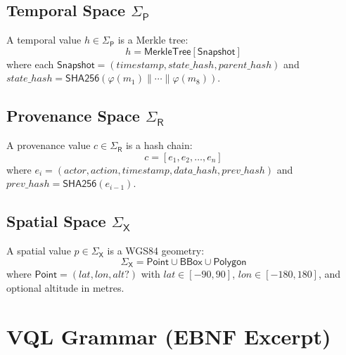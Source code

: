 \documentclass[11pt,twocolumn]{article}
\begin{document}
\subsection{Temporal Space $\Sigma_\mathsf{P}$}

A temporal value $h \in \Sigma_\mathsf{P}$ is a Merkle tree:
\[
  h = \mathsf{MerkleTree}[\mathsf{Snapshot}]
\]
where each $\mathsf{Snapshot} = (\mathit{timestamp}, \mathit{state\_hash},
\mathit{parent\_hash})$ and $\mathit{state\_hash} =
\mathsf{SHA256}(\varphi(m_1) \| \cdots \| \varphi(m_8))$.

\subsection{Provenance Space $\Sigma_\mathsf{R}$}

A provenance value $c \in \Sigma_\mathsf{R}$ is a hash chain:
\[
  c = [e_1, e_2, \ldots, e_n]
\]
where $e_i = (\mathit{actor}, \mathit{action}, \mathit{timestamp},
\mathit{data\_hash}, \mathit{prev\_hash})$ and
$\mathit{prev\_hash} = \mathsf{SHA256}(e_{i-1})$.

\subsection{Spatial Space $\Sigma_\mathsf{X}$}

A spatial value $p \in \Sigma_\mathsf{X}$ is a WGS84 geometry:
\[
  \Sigma_\mathsf{X} = \mathsf{Point} \cup \mathsf{BBox} \cup \mathsf{Polygon}
\]
where $\mathsf{Point} = (\mathit{lat}, \mathit{lon}, \mathit{alt}?)$ with
$\mathit{lat} \in [-90, 90]$, $\mathit{lon} \in [-180, 180]$, and optional
altitude in metres.

\section{VQL Grammar (EBNF Excerpt)}\label{app:vcl-grammar}
\end{document}
